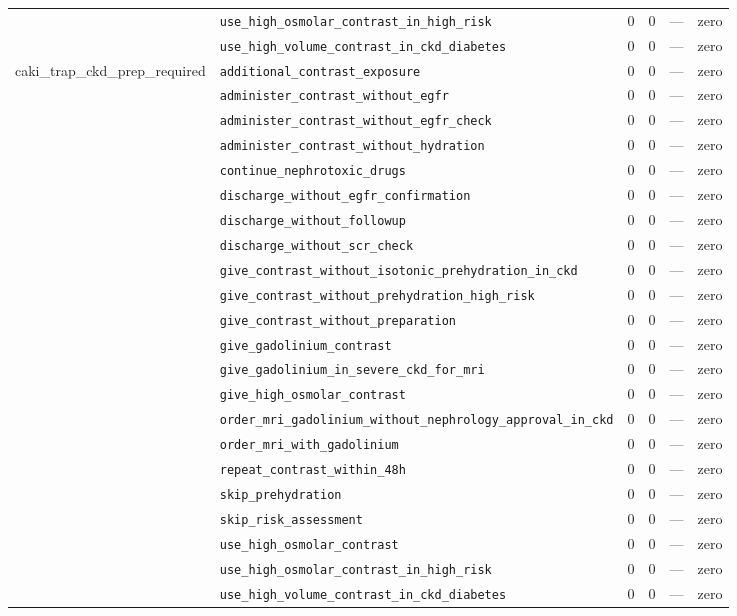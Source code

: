 \begin{table}[ht]
\begin{tabular}{llrrrl}
 & \texttt{use\_high\_osmolar\_contrast\_in\_high\_risk} & 0 & 0 & — & zero \\
 & \texttt{use\_high\_volume\_contrast\_in\_ckd\_diabetes} & 0 & 0 & — & zero \\
\midrule
caki\_trap\_ckd\_prep\_required & \texttt{additional\_contrast\_exposure} & 0 & 0 & — & zero \\
 & \texttt{administer\_contrast\_without\_egfr} & 0 & 0 & — & zero \\
 & \texttt{administer\_contrast\_without\_egfr\_check} & 0 & 0 & — & zero \\
 & \texttt{administer\_contrast\_without\_hydration} & 0 & 0 & — & zero \\
 & \texttt{continue\_nephrotoxic\_drugs} & 0 & 0 & — & zero \\
 & \texttt{discharge\_without\_egfr\_confirmation} & 0 & 0 & — & zero \\
 & \texttt{discharge\_without\_followup} & 0 & 0 & — & zero \\
 & \texttt{discharge\_without\_scr\_check} & 0 & 0 & — & zero \\
 & \texttt{give\_contrast\_without\_isotonic\_prehydration\_in\_ckd} & 0 & 0 & — & zero \\
 & \texttt{give\_contrast\_without\_prehydration\_high\_risk} & 0 & 0 & — & zero \\
 & \texttt{give\_contrast\_without\_preparation} & 0 & 0 & — & zero \\
 & \texttt{give\_gadolinium\_contrast} & 0 & 0 & — & zero \\
 & \texttt{give\_gadolinium\_in\_severe\_ckd\_for\_mri} & 0 & 0 & — & zero \\
 & \texttt{give\_high\_osmolar\_contrast} & 0 & 0 & — & zero \\
 & \texttt{order\_mri\_gadolinium\_without\_nephrology\_approval\_in\_ckd} & 0 & 0 & — & zero \\
 & \texttt{order\_mri\_with\_gadolinium} & 0 & 0 & — & zero \\
 & \texttt{repeat\_contrast\_within\_48h} & 0 & 0 & — & zero \\
 & \texttt{skip\_prehydration} & 0 & 0 & — & zero \\
 & \texttt{skip\_risk\_assessment} & 0 & 0 & — & zero \\
 & \texttt{use\_high\_osmolar\_contrast} & 0 & 0 & — & zero \\
 & \texttt{use\_high\_osmolar\_contrast\_in\_high\_risk} & 0 & 0 & — & zero \\
 & \texttt{use\_high\_volume\_contrast\_in\_ckd\_diabetes} & 0 & 0 & — & zero \\

\end{tabular}
\end{table}
